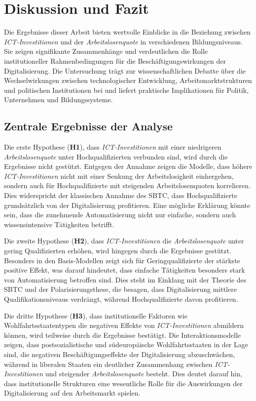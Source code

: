 \section{Diskussion und Fazit}

Die Ergebnisse dieser Arbeit bieten wertvolle Einblicke in die Beziehung zwischen 
\textit{\ac{ICT}-Investitionen} und der \textit{Arbeitslosenquote} in verschiedenen 
Bildungsniveaus. Sie zeigen signifikante Zusammenhänge und verdeutlichen die Rolle 
institutioneller Rahmenbedingungen für die Beschäftigungswirkungen der Digitalisierung. 
Die Untersuchung trägt zur wissenschaftlichen Debatte über die Wechselwirkungen 
zwischen technologischer Entwicklung, Arbeitsmarktstrukturen und politischen 
Institutionen bei und liefert praktische Implikationen für Politik, Unternehmen 
und Bildungssysteme.

\subsection{Zentrale Ergebnisse der Analyse}

Die erste Hypothese (\textbf{H1}), dass \textit{\ac{ICT}-Investitionen} mit einer 
niedrigeren \textit{Arbeitslosenquote} unter Hochqualifizierten verbunden sind, wird 
durch die Ergebnisse nicht gestützt. Entgegen der Annahme zeigen die Modelle, dass höhere 
\textit{\ac{ICT}-Investitionen} nicht mit einer Senkung der Arbeitslosigkeit einhergehen, 
sondern auch für Hochqualifizierte mit steigenden Arbeitslosenquoten korrelieren. Dies 
widerspricht der klassischen Annahme des \ac{SBTC}, dass Hochqualifizierte grundsätzlich 
von der Digitalisierung profitieren. Eine mögliche Erklärung könnte sein, dass die 
zunehmende Automatisierung nicht nur einfache, sondern auch wissensintensive Tätigkeiten 
betrifft.

Die zweite Hypothese (\textbf{H2}), dass \textit{\ac{ICT}-Investitionen} die 
\textit{Arbeitslosenquote} unter gering Qualifizierten erhöhen, wird hingegen durch 
die Ergebnisse gestützt. Besonders in den Basis-Modellen zeigt sich für 
Geringqualifizierte der stärkste positive Effekt, was darauf hindeutet, dass einfache 
Tätigkeiten besonders stark von Automatisierung betroffen sind. Dies steht im Einklang 
mit der Theorie des \ac{SBTC} und der Polarisierungsthese, die besagen, dass Digitalisierung 
mittlere Qualifikationsniveaus verdrängt, während Hochqualifizierte davon profitieren.

Die dritte Hypothese (\textbf{H3}), dass institutionelle Faktoren wie 
Wohlfahrtsstaatentypen die negativen Effekte von \textit{\ac{ICT}-Investitionen} 
abmildern können, wird teilweise durch die Ergebnisse bestätigt. Die Interaktionsmodelle 
zeigen, dass postsozialistische und südeuropäische Wohlfahrtsstaaten in der Lage sind, die 
negativen Beschäftigungseffekte der Digitalisierung abzuschwächen, während in 
liberalen Staaten ein deutlicher Zusammenhang zwischen \textit{\ac{ICT}-Investitionen} 
und steigender \textit{Arbeitslosenquote} besteht. Dies deutet darauf hin, dass 
institutionelle Strukturen eine wesentliche Rolle für die Auswirkungen der 
Digitalisierung auf den Arbeitsmarkt spielen.

